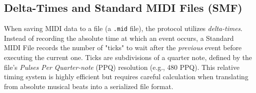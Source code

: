 \subsection{Delta-Times and Standard MIDI Files (SMF)}

When saving MIDI data to a file (a \texttt{.mid} file), the protocol utilizes \textit{delta-times}.
Instead of recording the absolute time at which an event occurs, a Standard MIDI File records the number of
"ticks" to wait after the \textit{previous} event before executing the current one.
Ticks are subdivisions of a quarter note, defined by the file's \textit{Pulses Per Quarter-note} (PPQ)
resolution (e.g., 480 PPQ).
This relative timing system is highly efficient but requires careful calculation when translating from
absolute musical beats into a serialized file format.
